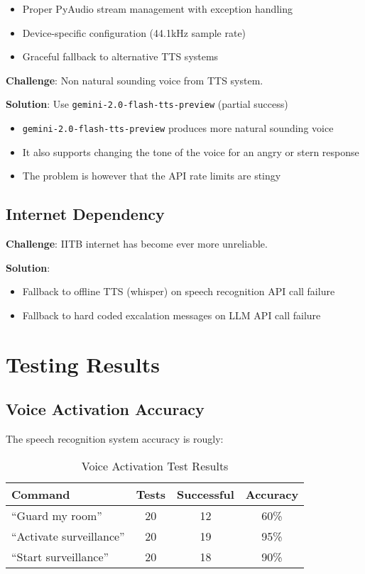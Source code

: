 \documentclass[11pt,a4paper]{article}
\begin{document}
\begin{itemize}
    \item Proper PyAudio stream management with exception handling
    \item Device-specific configuration (44.1kHz sample rate)
    \item Graceful fallback to alternative TTS systems
\end{itemize}


\textbf{Challenge}: Non natural sounding voice from TTS system.

\textbf{Solution}: Use \texttt{gemini-2.0-flash-tts-preview} (partial success)

\begin{itemize}
    \item \texttt{gemini-2.0-flash-tts-preview} produces more natural sounding voice
    \item It also supports changing the tone of the voice for an angry or stern response
    \item The problem is however that the API rate limits are stingy
\end{itemize}

\subsection{Internet Dependency}

\textbf{Challenge}: IITB internet has become ever more unreliable.

\textbf{Solution}: 
\begin{itemize}
    \item Fallback to offline TTS (whisper) on speech recognition API call failure
    \item Fallback to hard coded excalation messages on LLM API call failure 
\end{itemize}

\section{Testing Results}

\subsection{Voice Activation Accuracy}

The speech recognition system accuracy is rougly:

\begin{table}[H]
\centering
\begin{tabular}{|l|c|c|c|}
\hline
\textbf{Command} & \textbf{Tests} & \textbf{Successful} & \textbf{Accuracy} \\
\hline
``Guard my room'' & 20 & 12 & 60\% \\
``Activate surveillance'' & 20 & 19 & 95\% \\
``Start surveillance'' & 20 & 18 & 90\% \\
\end{tabular}
\caption{Voice Activation Test Results}
\end{table}
\end{document}
